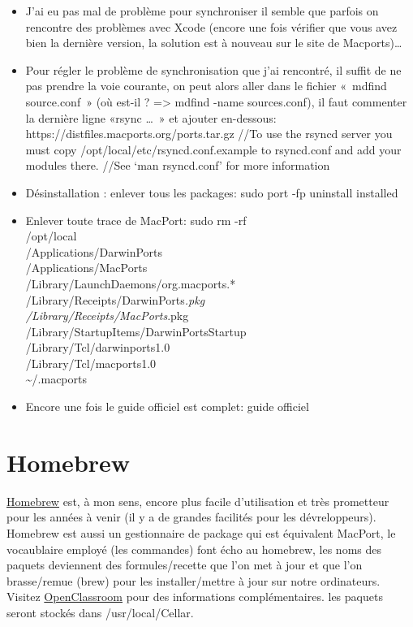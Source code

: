 \begin{itemize}
\item
  J'ai eu pas mal de problème pour synchroniser il semble que parfois on
  rencontre des problèmes avec Xcode (encore une fois vérifier que vous
  avez bien la dernière version, la solution est à nouveau sur le site
  de Macports)\ldots{}
\item
  Pour régler le problème de synchronisation que j'ai rencontré, il
  suffit de ne pas prendre la voie courante, on peut alors aller dans le
  fichier «~mdfind source.conf~» (où est-il ? =\textgreater{} mdfind
  -name sources.conf), il faut commenter la dernière ligne «rsync
  \ldots{}~» et ajouter en-dessous:
  https://distfiles.macports.org/ports.tar.gz //To use the rsyncd server
  you must copy /opt/local/etc/rsyncd.conf.example to rsyncd.conf and
  add your modules there. //See `man rsyncd.conf' for more information
\item
  Désinstallation : enlever tous les packages: sudo port -fp uninstall
  installed
\item
  Enlever toute trace de MacPort: sudo rm -rf\\
  /opt/local\\
  /Applications/DarwinPorts\\
  /Applications/MacPorts\\
  /Library/LaunchDaemons/org.macports.*\\
  /Library/Receipts/DarwinPorts\emph{.pkg\\
  /Library/Receipts/MacPorts}.pkg\\
  /Library/StartupItems/DarwinPortsStartup\\
  /Library/Tcl/darwinports1.0\\
  /Library/Tcl/macports1.0\\
  \textasciitilde{}/.macports
\item
  Encore une fois le guide officiel est complet: guide officiel
\end{itemize}

\section{Homebrew}\label{homebrew}

\href{http://brew.sh}{Homebrew} est, à mon sens, encore plus facile
d'utilisation et très prometteur pour les années à venir (il y a de
grandes facilités pour les dévreloppeurs). Homebrew est aussi un
gestionnaire de package qui est équivalent MacPort, le vocaublaire
employé (les commandes) font écho au homebrew, les noms des paquets
deviennent des formules/recette que l'on met à jour et que l'on
brasse/remue (brew) pour les installer/mettre à jour sur notre
ordinateurs. Visitez
\href{https://zestedesavoir.com/tutoriels/578/homebrew-pour-gerer-ses-logiciels-os-x/}{OpenClassroom}
pour des informations complémentaires. les paquets seront stockés dans
/usr/local/Cellar.

